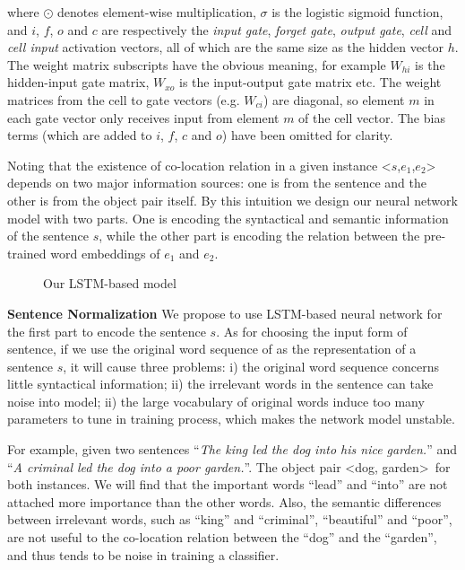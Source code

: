 where $\odot$ denotes element-wise multiplication, $\sigma$ is the logistic sigmoid function, and $i$, $f$, $o$ and $c$ are respectively the
\textit{input gate}, \textit{forget gate}, \textit{output gate}, \textit{cell} and \textit{cell input} activation vectors, all of which are the same size as the hidden vector $h$. The weight matrix subscripts have the obvious meaning, for example $W_{hi}$ is the hidden-input gate matrix, $W_{xo}$ is the input-output gate matrix etc. The weight matrices from the cell
to gate vectors (e.g. $W_{ci}$) are diagonal, so element $m$ in each gate vector only
receives input from element $m$ of the cell vector. The bias terms (which are
added to $i$, $f$, $c$ and $o$) have been omitted for clarity.

Noting that the existence of co-location relation in 
a given instance \textless $s$,$e_1$,$e_2$\textgreater~ depends 
on two major information sources: one is from the sentence 
and the other is from the object pair itself.
By this intuition we design our neural network model with two parts.
One is encoding the syntactical and semantic information of the sentence $s$, while the other part is encoding the relation between the pre-trained word embeddings of $e_1$ and $e_2$.


\begin{figure*}[th]
	\centering
	\caption{Our LSTM-based model}
	\label{fig:LSTM}
\end{figure*}

\noindent 
\textbf{Sentence Normalization}
We propose to use LSTM-based neural network for the first part to encode the sentence $s$.
As for choosing the input form of sentence, 
if we use the original word sequence of as the representation of a sentence $s$,  it will cause three problems: 
i) the original word sequence concerns little syntactical information;
ii) the irrelevant words in the sentence can take noise into model; 
ii) the large vocabulary of original words induce too many parameters to tune in training process, which makes the network model unstable.

For example, given two sentences 
``\textit{The king led the dog into his nice garden.}'' and 
``\textit{A criminal led the dog into a poor garden.}''. The object pair \textless dog, garden\textgreater~for both instances.
We will find that the important words ``lead'' and ``into'' are not attached more importance than the other words. 
Also, the semantic differences between irrelevant words, such as ``king'' and ``criminal'', ``beautiful'' and ``poor'', are not useful to the co-location
relation between the ``dog'' and the ``garden'', and 
thus tends to be noise in training a classifier.

